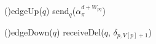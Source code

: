 
\SetInd{0.2em}{1em}

\small

\DontPrintSemicolon
\LinesNumbered

\Function(){\textup{edgeUp($q$)}}  {
     {
         send$_q$($\alpha_{\pi}^{d + W_{pq}}$)
         }
}


\Function(){\textup{edgeDown($q$)}} {
   {
       receiveDel($q$, $\delta_{p, V[p]+1}$)
  }
}


